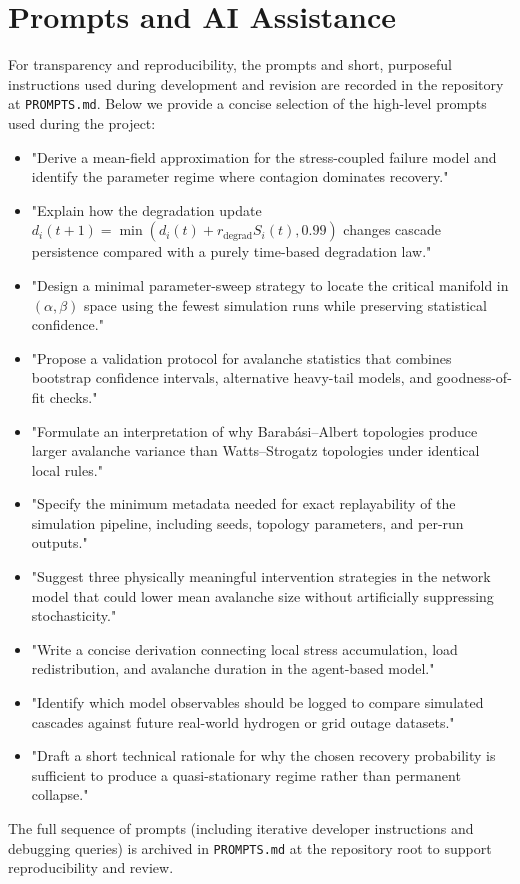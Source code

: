 \documentclass[12pt,a4paper,twoside]{report}
\begin{document}
\chapter{Prompts and AI Assistance}

For transparency and reproducibility, the prompts and short, purposeful instructions used during development and revision are recorded in the repository at \texttt{PROMPTS.md}. Below we provide a concise selection of the high-level prompts used during the project:

\begin{itemize}
\item "Derive a mean-field approximation for the stress-coupled failure model and identify the parameter regime where contagion dominates recovery."
\item "Explain how the degradation update $d_i(t+1)=\min(d_i(t)+r_{\text{degrad}}S_i(t),0.99)$ changes cascade persistence compared with a purely time-based degradation law."
\item "Design a minimal parameter-sweep strategy to locate the critical manifold in $(\alpha,\beta)$ space using the fewest simulation runs while preserving statistical confidence."
\item "Propose a validation protocol for avalanche statistics that combines bootstrap confidence intervals, alternative heavy-tail models, and goodness-of-fit checks."
\item "Formulate an interpretation of why Barab\'asi--Albert topologies produce larger avalanche variance than Watts--Strogatz topologies under identical local rules."
\item "Specify the minimum metadata needed for exact replayability of the simulation pipeline, including seeds, topology parameters, and per-run outputs."
\item "Suggest three physically meaningful intervention strategies in the network model that could lower mean avalanche size without artificially suppressing stochasticity."
\item "Write a concise derivation connecting local stress accumulation, load redistribution, and avalanche duration in the agent-based model."
\item "Identify which model observables should be logged to compare simulated cascades against future real-world hydrogen or grid outage datasets."
\item "Draft a short technical rationale for why the chosen recovery probability is sufficient to produce a quasi-stationary regime rather than permanent collapse."
\end{itemize}

The full sequence of prompts (including iterative developer instructions and debugging queries) is archived in \texttt{PROMPTS.md} at the repository root to support reproducibility and review.
\end{document}
